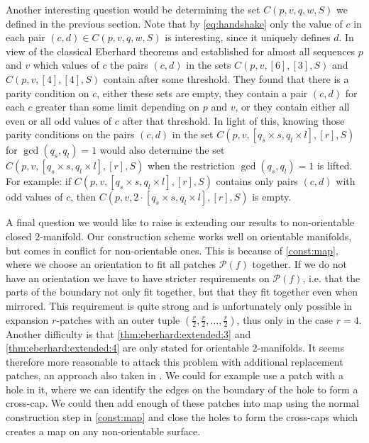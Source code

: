 Another interesting question would be determining the set $C(p, v, q, w, S)$ we defined in the previous section. Note that by \eqref{eq:handshake} only the value of $c$ in each pair $(c, d) \in C(p, v, q, w, S)$ is interesting, since it uniquely defines $d$. In view of the classical {\sc Eberhard} theorems \cite{jendrol1993face} and \cite{jucovivc1976face} established for almost all sequences $p$ and $v$ which values of $c$ the pairs $(c, d)$ in the sets $C(p, v, [6], [3], S)$ and $C(p, v, [4], [4], S)$ contain after some threshold. They found that there is a parity condition on $c$, either these sets are empty, they contain a pair $(c, d)$ for each $c$ greater than some limit depending on $p$ and $v$, or they contain either all even or all odd values of $c$ after that threshold. In light of this, knowing those parity conditions on the pairs $(c, d)$ in the set $C(p, v, [q_s \times s, q_l \times l], [r], S)$ for $\gcd(q_s, q_l) = 1$ would also determine the set $C(p, v, [q_s \times s, q_l \times l], [r], S)$ when the restriction $\gcd(q_s, q_l) = 1$ is lifted. For example: if $C(p, v, [q_s \times s, q_l \times l], [r], S)$ contains only pairs $(c, d)$ with odd values of $c$, then $C(p, v, 2 \cdot [q_s \times s, q_l \times l], [r], S)$ is empty.

A final question we would like to raise is extending our results to non-orientable closed $2$-manifold. Our construction scheme works well on orientable manifolds, but comes in conflict for non-orientable ones. This is because of \autoref{const:map}, where we choose an orientation to fit all patches $\mathcal{P}(f)$ together. If we do not have an orientation we have to have stricter requirements on $\mathcal{P}(f)$, i.e. that the parts of the boundary not only fit together, but that they fit together even when mirrored. This requirement is quite strong and is unfortunately only possible in expansion $r$-patches with an outer tuple $(\frac{r}{2}, \frac{r}{2}, \dots, \frac{r}{2})$, thus only in the case $r = 4$. Another difficulty is that \autoref{thm:eberhard:extended:3} and \autoref{thm:eberhard:extended:4} are only stated for orientable $2$-manifolds. It seems therefore more reasonable to attack this problem with additional replacement patches, an approach also taken in \cite{devos2010eberhard}. We could for example use a patch with a hole in it, where we can identify the edges on the boundary of the hole to form a cross-cap. We could then add enough of these patches into map using the normal construction step in \autoref{const:map} and close the holes to form the cross-caps which creates a map on any non-orientable surface.

